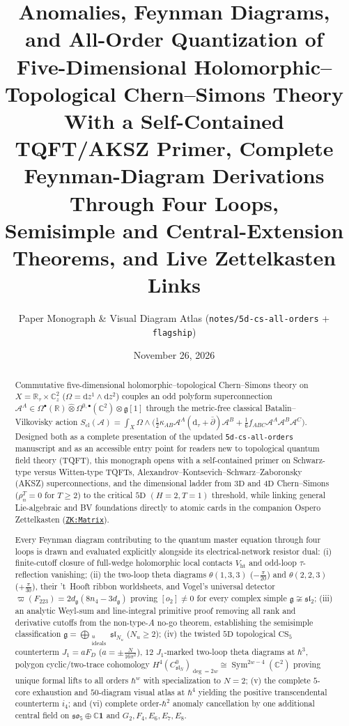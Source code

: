 \documentclass[11pt,letterpaper]{article}
\title{\vspace{-0.45cm}\bfseries Anomalies, Feynman Diagrams, and All-Order Quantization of\\
Five-Dimensional Holomorphic--Topological Chern--Simons Theory\\[0.32em]
\large With a Self-Contained TQFT/AKSZ Primer, Complete Feynman-Diagram Derivations Through Four Loops,\\
Semisimple and Central-Extension Theorems, and Live Zettelkasten Links}
\author{Paper Monograph \& Visual Diagram Atlas (\texttt{notes/5d-cs-all-orders} + \texttt{flagship})}
\date{November 26, 2026}
\numberwithin{equation}{section}
\theoremstyle{plain}
\theoremstyle{definition}
\theoremstyle{remark}
\newcommand{\dd}{\mathrm{d}}
\newcommand{\dbar}{\bar{\partial}}
\newcommand{\fg}{\mathfrak{g}}
\newcommand{\fsl}{\mathfrak{sl}}
\newcommand{\fso}{\mathfrak{so}}
\newcommand{\Sym}{\operatorname{Sym}}
\newcommand{\Vht}{V_{\mathrm{ht}}}
\newcommand{\zkmat}{\href{http://127.0.0.1:9124/?view=matrix}{\texttt{ZK:Matrix}}}
\begin{document}
\maketitle
\thispagestyle{empty}

\begin{abstract}
\noindent
Commutative five-dimensional holomorphic--topological Chern--Simons theory on $X = \mathbb{R}_\tau \times \mathbb{C}^2_z$ ($\Omega = \dd z^1\wedge\dd z^2$) couples an odd polyform superconnection $\mathcal{A}^A \in \Omega^\bullet(\mathbb{R})\widehat{\otimes}\Omega^{0,\bullet}(\mathbb{C}^2)\otimes\fg[1]$ through the metric-free classical Batalin--Vilkovisky action $S_{\mathrm{cl}}(\mathcal{A}) = \int_{X}\Omega\wedge\big(\frac{1}{2}\kappa_{AB}\mathcal{A}^A(\dd_\tau + \dbar)\mathcal{A}^B + \frac{1}{6}f_{ABC}\mathcal{A}^A\mathcal{A}^B\mathcal{A}^C\big)$. Designed both as a complete presentation of the updated \texttt{5d-cs-all-orders} manuscript and as an accessible entry point for readers new to topological quantum field theory (TQFT), this monograph opens with a self-contained primer on Schwarz-type versus Witten-type TQFTs, Alexandrov--Kontsevich--Schwarz--Zaboronsky (AKSZ) superconnections, and the dimensional ladder from $3\mathrm{D}$ and $4\mathrm{D}$ Chern--Simons ($\rho_n^T = 0$ for $T \ge 2$) to the critical $5\mathrm{D}$ $(H=2,T=1)$ threshold, while linking general Lie-algebraic and BV foundations directly to atomic cards in the companion Ospero Zettelkasten (\zkmat).

Every Feynman diagram contributing to the quantum master equation through four loops is drawn and evaluated explicitly alongside its electrical-network resistor dual: (i) finite-cutoff closure of full-wedge holomorphic local contacts $\Vht$ and odd-loop $\tau$-reflection vanishing; (ii) the two-loop theta diagrams $\theta(1,3,3)$ ($-\frac{\pi}{20}$) and $\theta(2,2,3)$ ($+\frac{\pi}{30}$), their 't~Hooft ribbon worldsheets, and Vogel's universal detector $\varpi(F_{223}) = 2d_{\fg}(8n_4 - 3d_{\fg})$ proving $[o_2] \neq 0$ for every complex simple $\fg \not\cong \fsl_2$; (iii) an analytic Weyl-sum and line-integral primitive proof removing all rank and derivative cutoffs from the non-type-$A$ no-go theorem, establishing the semisimple classification $\fg = \bigoplus_{\substack{u\\\mathrm{ideals}}}\fsl_{N_u}$ ($N_u \ge 2$); (iv) the twisted $5\mathrm{D}$ topological $\mathrm{CS}_5$ counterterm $J_1 = a F_D$ ($a = \pm\frac{N}{16\pi^2}$), $12$ $J_1$-marked two-loop theta diagrams at $\hbar^3$, polygon cyclic/two-trace cohomology $H^4(C^0_{\fsl_N})_{\deg=2w} \cong \Sym^{2w-4}(\mathbb{C}^2)$ proving unique formal lifts to all orders $\hbar^w$ with specialization to $N=2$; (v) the complete $5$-core exhaustion and $50$-diagram visual atlas at $\hbar^4$ yielding the positive transcendental counterterm $i_4$; and (vi) complete order-$\hbar^2$ anomaly cancellation by one additional central field on $\fso_5\oplus\mathbb{C}\mathbf{1}$ and $G_2,F_4,E_6,E_7,E_8$.
\end{abstract}
\end{document}
